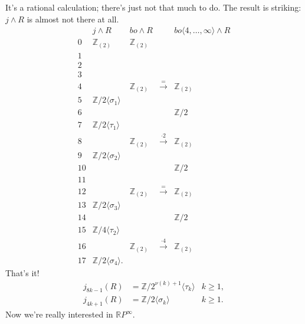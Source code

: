 \documentclass{article}
\newcommand{\Z}{\mathbb{Z}}
\newcommand{\R}{\mathbb{R}}
\newcommand{\RP}{\R P}
\newcommand{\sprod}{\wedge}
\begin{document}
It's a rational calculation; there's just not that much to do.  The result is striking: $j \sprod R$ is almost not there at all.
\[
\begin{array}{ccccc}
& j \sprod R & bo \sprod R & & bo \langle 4, \ldots, \infty \rangle \sprod R \\
0 & \Z_{(2)} & \Z_{(2)} \\
1 \\
2 \\
3 \\
4 & & \Z_{(2)} & \stackrel{=}{\to} & \Z_{(2)} \\
5 & \Z/2 \langle \sigma_1 \rangle \\
6 & & & & \Z/2 \\
7 & \Z/2 \langle \tau_1 \rangle \\
8 & & \Z_{(2)} & \stackrel{\cdot 2}{\to} & \Z_{(2)} \\
9 & \Z/2 \langle \sigma_2 \rangle \\
10 & & & & \Z/2 \\
11 \\
12 & & \Z_{(2)} & \stackrel{=}{\to} & \Z_{(2)} \\
13 & \Z/2 \langle \sigma_3 \rangle \\
14 & & & & \Z/2 \\
15 & \Z/4 \langle \tau_2 \rangle \\
16 & & \Z_{(2)} & \stackrel{\cdot 4}{\to} & \Z_{(2)} \\
17 & \Z/2 \langle \sigma_4 \rangle.
\end{array}
\]
That's it!
\begin{align*}
j_{8k-1}(R) & = \Z/2^{\nu(k)+1} \langle \tau_k \rangle & k \ge 1, \\
j_{4k+1}(R) & = \Z/2 \langle \sigma_k \rangle & k \ge 1.
\end{align*}
Now we're really interested in $\RP^\infty$.
\end{document}
